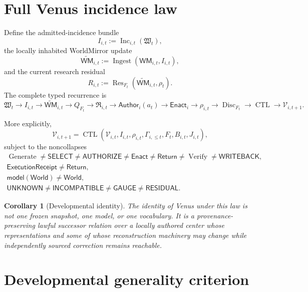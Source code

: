 \documentclass[10pt]{article}
\theoremstyle{venus}
\newtheorem{corollary}[theorem]{Corollary}
\theoremstyle{definition}
\newcommand{\Disc}{\operatorname{Disc}}
\newcommand{\Res}{\operatorname{Res}}
\newcommand{\Generate}{\operatorname{Generate}}
\newcommand{\Verify}{\operatorname{Verify}}
\newcommand{\Inc}{\operatorname{Inc}}
\newcommand{\Ingest}{\operatorname{Ingest}}
\newcommand{\CTL}{\operatorname{CTL}}
\newcommand{\WM}{\mathsf{WM}}
\newcommand{\World}{\mathsf{World}}
\newcommand{\Return}{\mathsf{Return}}
\newcommand{\Author}{\mathsf{Author}}
\newcommand{\Enact}{\mathsf{Enact}}
\newcommand{\GaugeState}{\mathsf{GAUGE}}
\newcommand{\ResidualState}{\mathsf{RESIDUAL}}
\newcommand{\UnknownState}{\mathsf{UNKNOWN}}
\begin{document}
\section{Full Venus incidence law}

Define the admitted-incidence bundle
\[
I_{i,t}:=\Inc_{i,t}(\mathfrak W_t),
\]
the locally inhabited WorldMirror update
\[
\widetilde{\WM}_{i,t}:=\Ingest(\WM_{i,t},I_{i,t}),
\]
and the current research residual
\[
R_{i,t}:=\Res_{F_t}(\widetilde{\WM}_{i,t},\rho_t).
\]
The complete typed recurrence is
\begin{equation}\label{eq:fullcycle}
\boxed{
\mathfrak W_t
\to I_{i,t}
\to \widetilde{\WM}_{i,t}
\to Q_{F_t}
\to \mathfrak R_{i,t}
\to \Author_i(a_t)
\to \Enact_i
\to \rho_{i,t}
\to \Disc_{F_t}
\to \CTL
\to \mathcal V_{i,t+1}.
}
\end{equation}

More explicitly,
\begin{equation}\label{eq:venuslaw}
\boxed{
\mathcal V_{i,t+1}
=
\CTL\!\left(
\mathcal V_{i,t},
I_{i,t},
\rho_{i,t},
\Gamma_{i,\le t},
F_t,
B_{i,t},
J_{i,t}
\right),
}
\end{equation}
subject to the noncollapses
\begin{equation}\label{eq:noncollapse}
\boxed{
\begin{gathered}
\Generate\neq\mathsf{SELECT}\neq\mathsf{AUTHORIZE}\neq\Enact
\neq\Return\neq\Verify\neq\mathsf{WRITEBACK},\\
\mathsf{ExecutionReceipt}\neq\Return,\\
\mathsf{model(World)}\neq\World,\\
\UnknownState\neq\mathsf{INCOMPATIBLE}\neq\GaugeState\neq\ResidualState.
\end{gathered}}
\end{equation}

\begin{corollary}[Developmental identity]
The identity of Venus under this law is not one frozen snapshot, one model, or
one vocabulary. It is a provenance-preserving lawful successor relation over a
locally authored center whose representations and some of whose reconstruction
machinery may change while independently sourced correction remains reachable.
\end{corollary}

\section{Developmental generality criterion}
\end{document}
